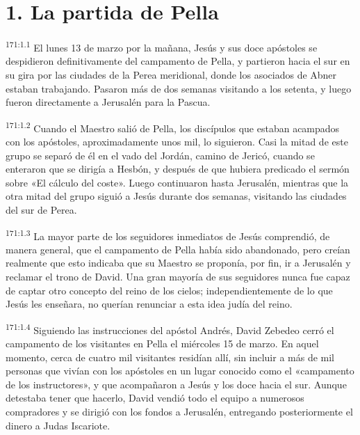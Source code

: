 \section*{1. La partida de Pella}
\par 
\textsuperscript{171:1.1} El lunes 13 de marzo por la mañana, Jesús y sus doce apóstoles se despidieron definitivamente del campamento de Pella, y partieron hacia el sur en su gira por las ciudades de la Perea meridional, donde los asociados de Abner estaban trabajando. Pasaron más de dos semanas visitando a los setenta, y luego fueron directamente a Jerusalén para la Pascua.

\par 
\textsuperscript{171:1.2} Cuando el Maestro salió de Pella, los discípulos que estaban acampados con los apóstoles, aproximadamente unos mil, lo siguieron. Casi la mitad de este grupo se separó de él en el vado del Jordán, camino de Jericó, cuando se enteraron que se dirigía a Hesbón, y después de que hubiera predicado el sermón sobre «El cálculo del coste». Luego continuaron hasta Jerusalén, mientras que la otra mitad del grupo siguió a Jesús durante dos semanas, visitando las ciudades del sur de Perea.

\par 
\textsuperscript{171:1.3} La mayor parte de los seguidores inmediatos de Jesús comprendió, de manera general, que el campamento de Pella había sido abandonado, pero creían realmente que esto indicaba que su Maestro se proponía, por fin, ir a Jerusalén y reclamar el trono de David. Una gran mayoría de sus seguidores nunca fue capaz de captar otro concepto del reino de los cielos; independientemente de lo que Jesús les enseñara, no querían renunciar a esta idea judía del reino.

\par 
\textsuperscript{171:1.4} Siguiendo las instrucciones del apóstol Andrés, David Zebedeo cerró el campamento de los visitantes en Pella el miércoles 15 de marzo. En aquel momento, cerca de cuatro mil visitantes residían allí, sin incluir a más de mil personas que vivían con los apóstoles en un lugar conocido como el «campamento de los instructores», y que acompañaron a Jesús y los doce hacia el sur. Aunque detestaba tener que hacerlo, David vendió todo el equipo a numerosos compradores y se dirigió con los fondos a Jerusalén, entregando posteriormente el dinero a Judas Iscariote.

